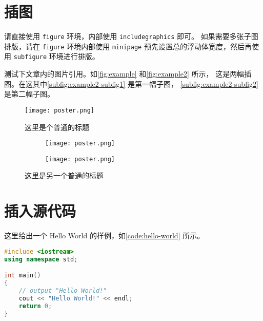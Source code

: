 \documentclass[lang=chs, degree=phd, blindreview=false, winfonts=true, academic=true]{yanputhesis}
\begin{document}
\section{插图}

请直接使用 \lstinline`figure` 环境，内部使用 \lstinline`includegraphics` 即可。
如果需要多张子图排版，请在 \lstinline`figure` 环境内部使用 \lstinline`minipage`
预先设置总的浮动体宽度，然后再使用 \lstinline`subfigure` 环境进行排版。

测试下文章内的图片引用。如\autoref{fig:example} 和\autoref{fig:example2} 所示，
这是两幅插图。在这其中\autoref{subfig:example2-subfig1} 是第一幅子图，
\autoref{subfig:example2-subfig2} 是第二幅子图。

\begin{figure}[htb]
    \centering
    \texttt{[image: poster.png]}
    \caption{
        这里是个普通的标题
    }
    \label{fig:example}
\end{figure}

\begin{figure}[htb]
    \centering
    \begin{minipage}[t]{0.96\textwidth}
        \centering
        \begin{subfigure}[t]{0.47\textwidth}
            \centering
            \texttt{[image: poster.png]}
            \caption{\label{subfig:example2-subfig1}}
        \end{subfigure}
        \begin{subfigure}[t]{0.47\textwidth}
            \centering
            \texttt{[image: poster.png]}
            \caption{\label{subfig:example2-subfig2}}
        \end{subfigure}
    \end{minipage}
    \caption{这里是另一个普通的标题}
    \label{fig:example2}
\end{figure}

\section{插入源代码}

这里给出一个 Hello World 的样例，如\autoref{code:hello-world} 所示。

\begin{lstlisting}[language={C++}, label={code:hello-world},
    caption={Hello World.cpp}]
#include <iostream>
using namespace std;

int main()
{
    // output "Hello World!"
    cout << "Hello World!" << endl;
    return 0;
}
\end{lstlisting}
\end{document}
